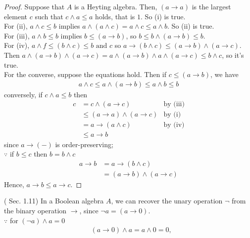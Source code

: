 \documentclass[a4j,12pt]{jarticle}
\numberwithin{equation}{section}
\begin{document}
\begin{proof}
  Suppose that $A$ is a Heyting algebra. Then, $(a \rightarrow a)$ is the largest element $c$ such that $c \wedge a \le a$ holds, that is $1$. So (i) is true.\\
  For (ii), $a \wedge c \le b$ implies $a \wedge (a \wedge c) = a \wedge c \le a \wedge b$. So (ii) is true.\\
  For (iii), $a \wedge b \le b$ implies $b \le (a \rightarrow b)$, so $b \le b \wedge (a \rightarrow b) \le b$.\\
  For (iv), $a \wedge f \le (b \wedge c) \le b \text{ and } c$ so $a \rightarrow (b \wedge c) \le (a \rightarrow b) \wedge (a \rightarrow c)$.\\
  Then $a \wedge (a \rightarrow b) \wedge (a \rightarrow c) = a \wedge (a \rightarrow b) \wedge a \wedge (a \rightarrow c) \le b \wedge c$, so it's true.\\
  For the converse, suppose the equations hold. Then if $c \le (a \rightarrow b)$, we have
  \begin{align*}
    a \wedge c \le a \wedge (a \rightarrow b) \le a \wedge b \le b
  \end{align*}
  conversely, if $c \wedge a \le b$ then
  \begin{align*}
    c &= c \wedge (a \rightarrow c) & \text{by (iii)} \\
      &\le(a \rightarrow a) \wedge (a \rightarrow c) & \text{by (i)} \\
      &=a \rightarrow (a \wedge c) & \text{by (iv)} \\
      &\le a \rightarrow b
  \end{align*}
  since $a \rightarrow (-)$ is order-preserving;\\
  $\because$ if $b \le c$ then $b = b \wedge c$
  \begin{align*}
    a \rightarrow b &= a \rightarrow (b \wedge c) \\
                    &= (a \rightarrow b) \wedge (a \rightarrow c)
  \end{align*}
  Hence, $a \rightarrow b \le a \rightarrow c$.
\end{proof}
(\cite{Stone} Sec. 1.11) In a Boolean algebra $A$, we can recover the unary operation $\neg$ from the binary operation $\rightarrow$, since $\neg a = (a \rightarrow 0)$.\\
$\because$ for $(\neg a) \wedge a =0$
\begin{align*}
  &(a \rightarrow 0) \wedge a = a \wedge 0 = 0,
\end{align*}
\end{document}
